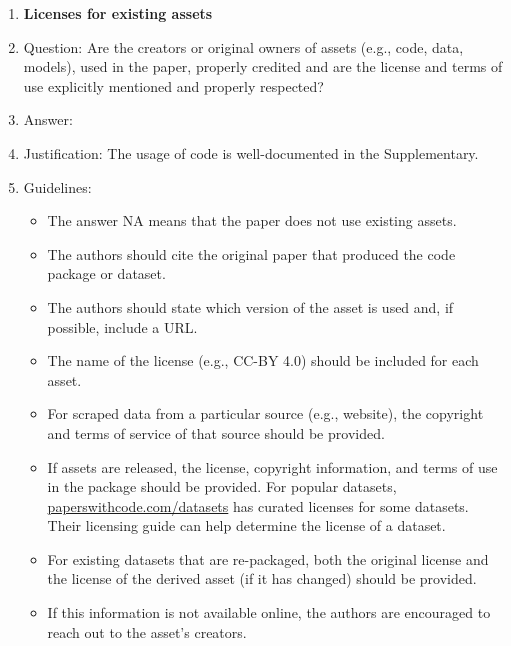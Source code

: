 \documentclass{article}
\theoremstyle{definition} \newtheorem{definition}{Definition}  \newtheorem{example}{Example}
\theoremstyle{remark} \newtheorem{remark}{Remark}
\newcounter{ct}
\begin{document}
\begin{enumerate}
\item {\bf Licenses for existing assets}
    \item[] Question: Are the creators or original owners of assets (e.g., code, data, models), used in the paper, properly credited and are the license and terms of use explicitly mentioned and properly respected?
    \item[] Answer: \answerYes{} %
    \item[] Justification: The usage of code is well-documented in the Supplementary.
    \item[] Guidelines:
    \begin{itemize}
        \item The answer NA means that the paper does not use existing assets.
        \item The authors should cite the original paper that produced the code package or dataset.
        \item The authors should state which version of the asset is used and, if possible, include a URL.
        \item The name of the license (e.g., CC-BY 4.0) should be included for each asset.
        \item For scraped data from a particular source (e.g., website), the copyright and terms of service of that source should be provided.
        \item If assets are released, the license, copyright information, and terms of use in the package should be provided. For popular datasets, \url{paperswithcode.com/datasets} has curated licenses for some datasets. Their licensing guide can help determine the license of a dataset.
        \item For existing datasets that are re-packaged, both the original license and the license of the derived asset (if it has changed) should be provided.
        \item If this information is not available online, the authors are encouraged to reach out to the asset's creators.
    \end{itemize}


\end{enumerate}
\end{document}
